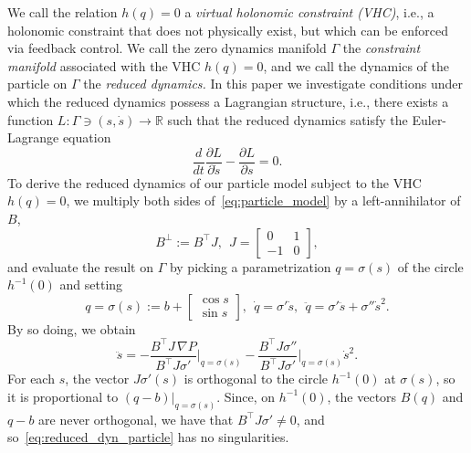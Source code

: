 We call the relation $h(q)=0$ a {\em virtual holonomic constraint
	(VHC)}, i.e., a holonomic constraint that does not physically exist,
but which can be enforced via feedback control. We call the zero
dynamics manifold $\Gamma$ the {\em constraint manifold} associated
with the VHC $h(q)=0$, and we call the dynamics of the particle on
$\Gamma$ the {\em reduced dynamics.} In this paper we investigate
conditions under which the reduced dynamics possess a Lagrangian
structure, i.e., there exists a function $L: \Gamma \ni (s,\dot s) \to
\mathbb{R}$ such that the reduced dynamics satisfy the Euler-Lagrange
equation 
\[
\frac{d}{dt} \frac{\partial L}{\partial \dot s} - \frac{\partial
	L}{\partial s} =0.
\]
To derive the reduced dynamics of our particle model subject to the
VHC $h(q)=0$, we multiply both sides of~\eqref{eq:particle_model} by a
left-annihilator of $B$,
\[
B^\perp:= B^\top J, \ \ J=\begin{bmatrix} 0 & 1 \\ -1 & 0
\end{bmatrix},
\]
and evaluate the result on $\Gamma$ by picking a parametrization $q=
\sigma(s)$ of the circle $h^{-1}(0)$ and setting
\[
q = \sigma(s):=b+\begin{bmatrix} \cos s \\ \sin s
\end{bmatrix}, \ \ \dot q = \sigma'
\dot s, \ \ \ddot q =\sigma' \ddot s + \sigma'' \dot s^2.
\]
By so doing, we obtain
\begin{equation}\label{eq:reduced_dyn_particle}
\ddot s = -\frac{B^\top J \,\nabla P}{B^\top J
	\sigma'}\Bigg|_{q = \sigma(s)} -\frac{B^\top J \sigma''}{B^\top J
	\sigma'}\Bigg|_{q = \sigma(s)} \dot s^2.
\end{equation}
For each $s$, the vector $J \sigma'(s)$ is orthogonal to the circle
$h^{-1}(0)$ at $\sigma(s)$, so it is proportional to
$(q-b)|_{q=\sigma(s)}$. Since, on $h^{-1}(0)$, the vectors $B(q)$ and
$q-b$ are never orthogonal, we have that $B^\top J \sigma' \neq 0$,
and so~\eqref{eq:reduced_dyn_particle} has no singularities.

